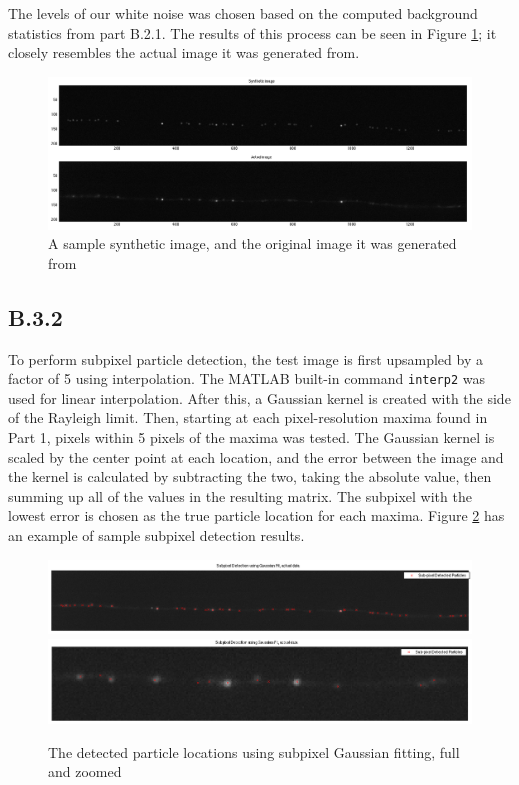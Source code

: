 \documentclass{article}
\begin{document}
The levels of our white noise was chosen based on the computed background statistics from part B.2.1. The results of this process can be seen in Figure \ref{fig:syntheticImage}; it closely resembles the actual image it was generated from.

\begin{figure}[H]
\centering
\includegraphics[width=16cm]{figures/synthetic_image.png}
\caption{A sample synthetic image, and the original image it was generated from}
\label{fig:syntheticImage}
\end{figure}


\subsection*{B.3.2}

To perform subpixel particle detection, the test image is first upsampled by a factor of 5 using interpolation. The MATLAB built-in command \texttt{interp2} was used for linear interpolation. After this, a Gaussian kernel is created with the side of the Rayleigh limit. Then, starting at each pixel-resolution maxima found in Part 1, pixels within 5 pixels of the maxima was tested. The Gaussian kernel is scaled by the center point at each location, and the error between the image and the kernel is calculated by subtracting the two, taking the absolute value, then summing up all of the values in the resulting matrix. The subpixel with the lowest error is chosen as the true particle location for each maxima. Figure \ref{fig:subpixelReal} has an example of sample subpixel detection results.

\begin{figure}[H]
\centering
\includegraphics[width=16cm]{figures/subpixel_real_full.png}
\includegraphics[width=16cm]{figures/subpixel_real_zoom.png}
\caption{The detected particle locations using subpixel Gaussian fitting, full and zoomed}
\label{fig:subpixelReal}
\end{figure}
\end{document}
